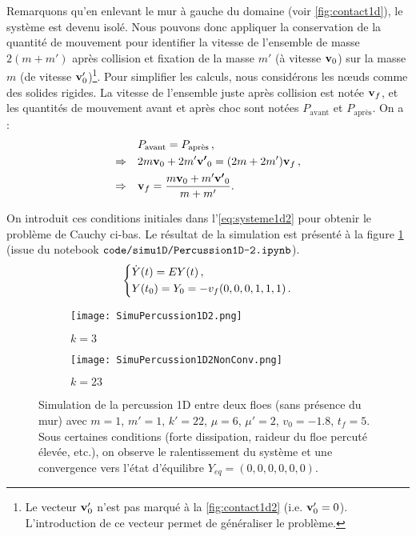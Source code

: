 Remarquons qu'en enlevant le mur à gauche du domaine (voir \cref{fig:contact1d}), le système est devenu isolé. Nous pouvons donc appliquer la conservation de la quantité de mouvement pour identifier la vitesse de l'ensemble de masse $2(m+m')$ après collision et fixation de la masse $m'$ (à vitesse $\bm{\mathrm{v}}_0$) sur la masse $m$ (de vitesse $\bm{\mathrm{v}}'_0$)\footnote{Le vecteur $\bm{\mathrm{v}}'_0$ n'est pas marqué à la \cref{fig:contact1d2} (i.e. $\bm{\mathrm{v}}'_0 = 0$). L'introduction de ce vecteur permet de généraliser le problème.}. Pour simplifier les calculs, nous considérons les n\oe{}uds comme des solides rigides. La vitesse de l'ensemble juste après collision est notée $\bm{\mathrm{v}}_f$, et les quantités de mouvement avant et après choc sont notées $P_{\text{avant}}$ et $P_{\text{après}}$. On a :
\begin{align*}
    & \quad P_{\text{avant}} = P_{\text{après}} \,, \\
    \Rightarrow & \quad 2m \bm{\mathrm{v}}_0 + 2m'\bm{\mathrm{v'}}_0 = (2m + 2m') \bm{\mathrm{v}}_f \,, \\
    \Rightarrow & \quad \bm{\mathrm{v}}_f = \frac{m \bm{\mathrm{v}}_0 + m'\bm{\mathrm{v'}}_0}{m+m'} .
\end{align*} 

\noindent On introduit ces conditions initiales dans l'\cref{eq:systeme1d2} pour obtenir le problème de Cauchy ci-bas. Le résultat de la simulation est présenté à la figure \cref{fig:simucontact1d2} (issue du notebook $\verb|code/simu1D/Percussion1D-2.ipynb|$). 
\begin{align} \label{eq:systeme1d3}
    \begin{dcases}
        \dot{Y}(t)= E Y(t) \,, \\
        Y(t_0) = Y_0 = -v_f(0,0,0,1,1,1) \,.        
    \end{dcases}
\end{align}

\begin{figure}[!h]
    \centering
    \begin{subfigure}{0.45\textwidth}
        \centering
        \texttt{[image: SimuPercussion1D2.png]}
        \caption{$k=3$}
    \end{subfigure}
    \begin{subfigure}{0.45\textwidth}
        \centering
        \texttt{[image: SimuPercussion1D2NonConv.png]}
        \caption{$k=23$}
    \end{subfigure}

    \caption{Simulation de la percussion 1D entre deux floes (sans présence du mur) avec $m=1$, $m'=1$, $k'=22$, $\mu=6$, $\mu'=2$, $v_0=-1.8$, $t_{f}=5$. Sous certaines conditions (forte dissipation, raideur du floe percuté élevée, etc.), on observe le ralentissement du système et une convergence vers l'état d'équilibre $Y_{eq}=(0,0,0,0,0,0)$.} 
    \label{fig:simucontact1d2}
\end{figure}

